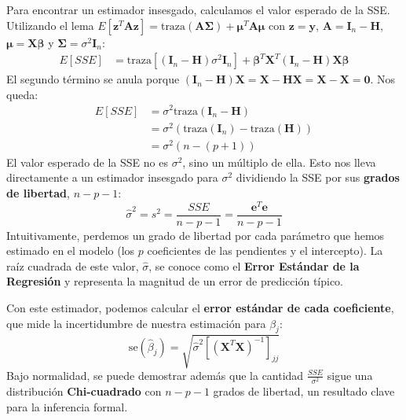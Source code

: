 \documentclass[
  letterpaper,
  DIV=11,
  numbers=noendperiod]{scrreprt}
\begin{document}
Para encontrar un estimador insesgado, calculamos el valor esperado de
la SSE. Utilizando el lema
\(E[\mathbf{z}^T\mathbf{A}\mathbf{z}] = \text{traza}(\mathbf{A}\boldsymbol{\Sigma}) + \boldsymbol{\mu}^T\mathbf{A}\boldsymbol{\mu}\)
con \(\mathbf{z} = \mathbf{y}\),
\(\mathbf{A} = \mathbf{I}_n - \mathbf{H}\),
\(\boldsymbol{\mu} = \mathbf{X}\boldsymbol{\beta}\) y
\(\boldsymbol{\Sigma} = \sigma^2\mathbf{I}_n\): \begin{align}
E[SSE] &= \text{traza}[(\mathbf{I}_n - \mathbf{H})\sigma^2\mathbf{I}_n] + \boldsymbol{\beta}^T\mathbf{X}^T(\mathbf{I}_n - \mathbf{H})\mathbf{X}\boldsymbol{\beta} \nonumber
\end{align} El segundo término se anula porque
\((\mathbf{I}_n - \mathbf{H})\mathbf{X} = \mathbf{X} - \mathbf{H}\mathbf{X} = \mathbf{X} - \mathbf{X} = \mathbf{0}\).
Nos queda: \begin{align}
E[SSE] &= \sigma^2 \text{traza}(\mathbf{I}_n - \mathbf{H}) \nonumber \\
&= \sigma^2 (\text{traza}(\mathbf{I}_n) - \text{traza}(\mathbf{H})) \nonumber \\
&= \sigma^2 (n - (p + 1)) \nonumber
\end{align} El valor esperado de la SSE no es \(\sigma^2\), sino un
múltiplo de ella. Esto nos lleva directamente a un estimador insesgado
para \(\sigma^2\) dividiendo la SSE por sus \textbf{grados de libertad},
\(n - p - 1\):
\[\hat{\sigma}^2 = s^2 = \frac{SSE}{n - p - 1} = \frac{\mathbf{e}^T\mathbf{e}}{n - p - 1}\]
Intuitivamente, perdemos un grado de libertad por cada parámetro que
hemos estimado en el modelo (los \(p\) coeficientes de las pendientes y
el intercepto). La raíz cuadrada de este valor, \(\hat{\sigma}\), se
conoce como el \textbf{Error Estándar de la Regresión} y representa la
magnitud de un error de predicción típico.

Con este estimador, podemos calcular el \textbf{error estándar de cada
coeficiente}, que mide la incertidumbre de nuestra estimación para
\(\beta_j\):
\[\text{se}(\hat{\beta}_j) = \sqrt{\hat{\sigma}^2 [(\mathbf{X}^T\mathbf{X})^{-1}]_{jj}}\]
Bajo normalidad, se puede demostrar además que la cantidad
\(\frac{SSE}{\sigma^2}\) sigue una distribución \textbf{Chi-cuadrado}
con \(n-p-1\) grados de libertad, un resultado clave para la inferencia
formal.
\end{document}
